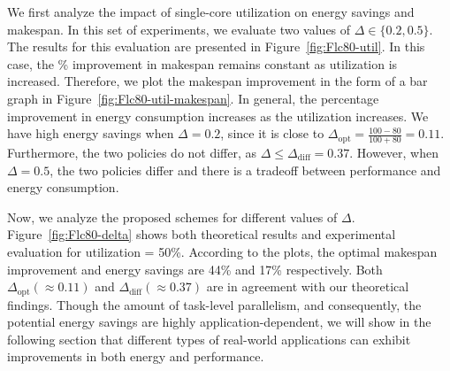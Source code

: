 We first analyze the impact of single-core utilization on energy savings and makespan. In this set of experiments, we evaluate two values of $\Delta\in\{0.2, 0.5\}$. The results for this evaluation are presented in Figure~\ref{fig:Flc80-util}. In this case, the \% improvement in makespan remains constant as utilization is increased. Therefore, we plot the makespan improvement in the form of a bar graph in Figure~\ref{fig:Flc80-util-makespan}. %
In general, the percentage improvement in energy consumption increases as the utilization increases. We have high energy savings when $\Delta = 0.2$, since it is close to $\Delta_\mathrm{opt}=\frac{100-80}{100+80}=0.11$. Furthermore, the two policies do not differ, as $\Delta \leq \Delta_\mathrm{diff}=0.37$. However, when $\Delta = 0.5$, the two policies differ and there is a tradeoff between performance and energy consumption. %

Now, we analyze the proposed schemes for different values of $\Delta$. Figure~\ref{fig:Flc80-delta} shows both theoretical results and experimental evaluation for utilization = 50\%. According to the plots, the optimal makespan improvement and energy savings are 44\% and 17\% respectively. Both $\Delta_\mathrm{opt}(\approx 0.11)$ and $\Delta_\mathrm{diff}(\approx 0.37)$ are in agreement with our theoretical findings. Though the amount of task-level parallelism, and consequently, the potential energy savings are highly application-dependent, we will show in the following section that different types of real-world applications can exhibit improvements in both energy and performance.


